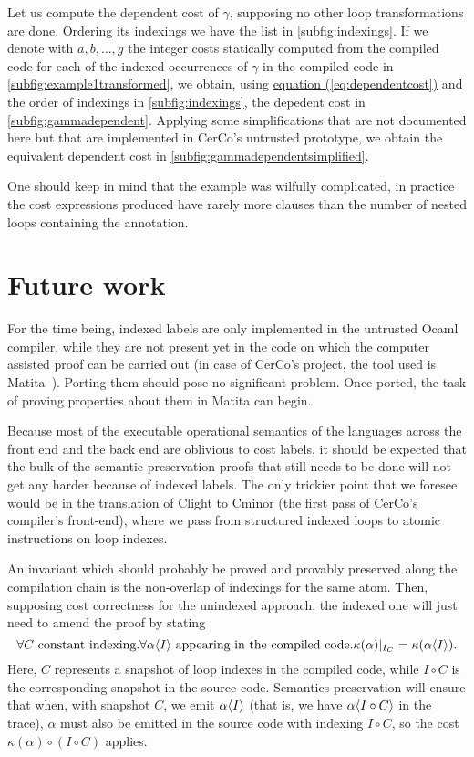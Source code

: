 \documentclass[submission,copyright,creativecommons]{eptcs}
\theoremstyle{definition}
\newcommand{\s}[1]{{\sf #1}}    \newcommand{\vc}[1]{{\bf #1}}
\begin{document}
Let us compute the dependent cost of $\gamma$, supposing no other loop transformations
are done. Ordering its indexings we
have the list in \autoref{subfig:indexings}.
If we denote with $a,b,\ldots,g$ the integer costs statically computed from
the compiled code for each of the indexed occurrences of $\gamma$ in the compiled code in \autoref{subfig:example1transformed},
we obtain, using \hyperref[eq:dependentcost]{equation (\ref*{eq:dependentcost})}
and the order of indexings in \autoref{subfig:indexings}, the depedent cost in
\autoref{subfig:gammadependent}. Applying some simplifications that are not
documented here but that are implemented in CerCo's untrusted prototype,
we obtain the equivalent dependent cost in \autoref{subfig:gammadependentsimplified}.

One should keep in mind that the example was wilfully complicated, in practice
the cost expressions produced have rarely more clauses
than the number of nested loops containing the annotation.

\section{Future work}\label{sec:future}
For the time being, indexed labels are only implemented in the untrusted Ocaml compiler, while they are not present yet in the code on which the computer assisted proof can be carried out (in case of CerCo's
project, the tool used is Matita~\cite{matita}). Porting them should pose no significant problem.
Once ported, the task of proving properties about them in Matita can begin.

Because most of the executable operational semantics of the languages across the front end and the back end are oblivious to cost labels, it should be expected that the bulk of the semantic preservation proofs that still needs to be done will not get any harder because of indexed labels.
The only trickier point that we foresee would be in the translation of \s{Clight} to \s{Cminor} (the first pass of CerCo's compiler's front-end), where we pass from structured indexed loops to atomic instructions on loop indexes.

An invariant which should probably be proved and provably preserved along the compilation chain is the non-overlap of indexings for the same atom.
Then, supposing cost correctness for the unindexed approach, the indexed one will just need to amend the proof by stating
$$\forall C\text{ constant indexing}.\forall \alpha\langle I\rangle\text{ appearing in the compiled code}.
  \kappa(\alpha)|_{I_C} = \kappa(\alpha\langle I \rangle).
$$
Here, $C$ represents a snapshot of loop indexes in the compiled code, while $I\circ C$ is the corresponding snapshot in the source code.
Semantics preservation will ensure that when, with snapshot $C$, we emit $\alpha\langle I\rangle$ (that is, we have $\alpha\langle I\circ C\rangle$ in the trace), $\alpha$ must also be emitted in the source code with indexing $I\circ C$, so the cost $\kappa(\alpha)\circ (I\circ C)$ applies.
\end{document}
